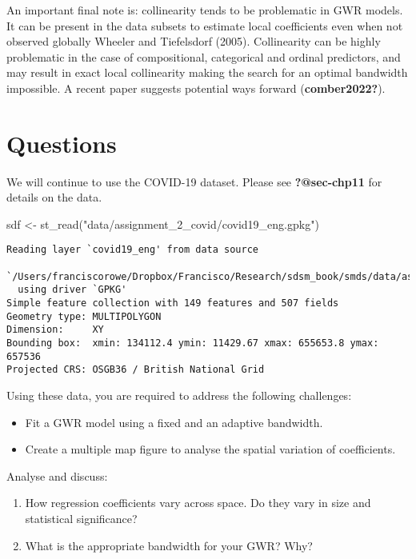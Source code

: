 \documentclass[
  letterpaper,
  krantz2]{style/krantz}
\newenvironment{Shaded}{\begin{snugshade}}{\end{snugshade}}
\newcommand{\FunctionTok}[1]{\textcolor[rgb]{0.28,0.35,0.67}{#1}}
\newcommand{\NormalTok}[1]{\textcolor[rgb]{0.00,0.23,0.31}{#1}}
\newcommand{\OtherTok}[1]{\textcolor[rgb]{0.00,0.23,0.31}{#1}}
\newcommand{\StringTok}[1]{\textcolor[rgb]{0.13,0.47,0.30}{#1}}
\providecommand{\tightlist}{%
  \setlength{\itemsep}{0pt}\setlength{\parskip}{0pt}}\usepackage{longtable,booktabs,array}
\begin{document}
An important final note is: collinearity tends to be problematic in GWR
models. It can be present in the data subsets to estimate local
coefficients even when not observed globally Wheeler and Tiefelsdorf
(2005). Collinearity can be highly problematic in the case of
compositional, categorical and ordinal predictors, and may result in
exact local collinearity making the search for an optimal bandwidth
impossible. A recent paper suggests potential ways forward
(\textbf{comber2022?}).

\hypertarget{questions-5}{%
\section{Questions}\label{questions-5}}

We will continue to use the COVID-19 dataset. Please see
\textbf{?@sec-chp11} for details on the data.

\begin{Shaded}
\begin{Highlighting}[]
\NormalTok{sdf }\OtherTok{\textless{}{-}} \FunctionTok{st\_read}\NormalTok{(}\StringTok{"data/assignment\_2\_covid/covid19\_eng.gpkg"}\NormalTok{)}
\end{Highlighting}
\end{Shaded}

\begin{verbatim}
Reading layer `covid19_eng' from data source 
  `/Users/franciscorowe/Dropbox/Francisco/Research/sdsm_book/smds/data/assignment_2_covid/covid19_eng.gpkg' 
  using driver `GPKG'
Simple feature collection with 149 features and 507 fields
Geometry type: MULTIPOLYGON
Dimension:     XY
Bounding box:  xmin: 134112.4 ymin: 11429.67 xmax: 655653.8 ymax: 657536
Projected CRS: OSGB36 / British National Grid
\end{verbatim}

Using these data, you are required to address the following challenges:

\begin{itemize}
\item
  Fit a GWR model using a fixed and an adaptive bandwidth.
\item
  Create a multiple map figure to analyse the spatial variation of
  coefficients.
\end{itemize}

Analyse and discuss:

\begin{enumerate}
\def\labelenumi{\arabic{enumi}.}
\tightlist
\item
  How regression coefficients vary across space. Do they vary in size
  and statistical significance?
\item
  What is the appropriate bandwidth for your GWR? Why?
\end{enumerate}
\end{document}
